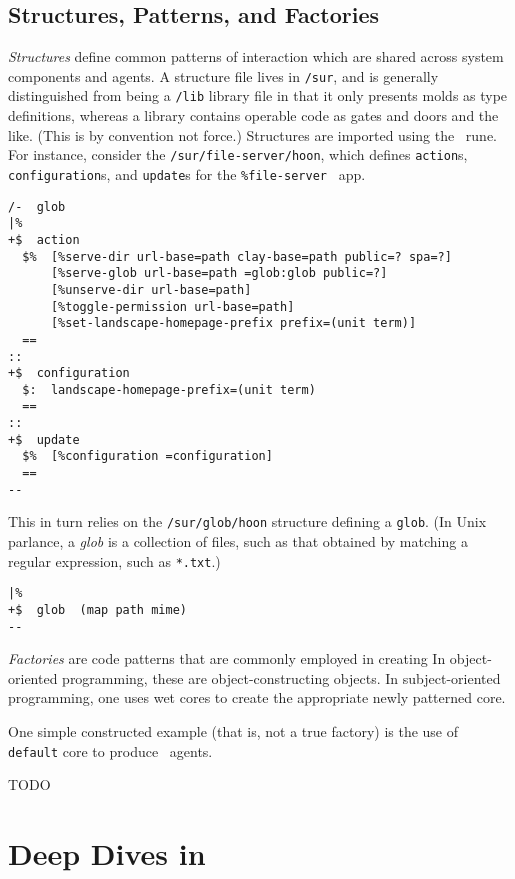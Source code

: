 \subsection{Structures, Patterns, and Factories}

\emph{Structures} define common patterns of interaction which are shared across system components and agents.  A structure file lives in \texttt{/sur}, and is generally distinguished from being a \texttt{/lib} library file in that it only presents molds as type definitions, whereas a library contains operable code as gates and doors and the like.  (This is by convention not force.)  Structures are imported using the \pfaslus~rune.  For instance, consider the \texttt{/sur/file-server/hoon}, which defines \texttt{action}s, \texttt{configuration}s, and \texttt{update}s for the \texttt{\%file-server} \gall~app.

\begin{lstlisting}[caption={\texttt{/sur/file-server/hoon}}]
/-  glob
|%
+$  action
  $%  [%serve-dir url-base=path clay-base=path public=? spa=?]
      [%serve-glob url-base=path =glob:glob public=?]
      [%unserve-dir url-base=path]
      [%toggle-permission url-base=path]
      [%set-landscape-homepage-prefix prefix=(unit term)]
  ==
::
+$  configuration
  $:  landscape-homepage-prefix=(unit term)
  ==
::
+$  update
  $%  [%configuration =configuration]
  ==
--
\end{lstlisting}

This in turn relies on the \texttt{/sur/glob/hoon} structure defining a \texttt{glob}.  (In Unix parlance, a \emph{glob} is a collection of files, such as that obtained by matching a regular expression, such as \texttt{*.txt}.)

\begin{lstlisting}[caption={\texttt{/sur/glob/hoon}}]
|%
+$  glob  (map path mime)
--
\end{lstlisting}



\emph{Factories} are code patterns that are commonly employed in creating
In object-oriented programming, these are object-constructing objects.  In subject-oriented programming, one uses wet cores to create the appropriate newly patterned core.

One simple constructed example (that is, not a true factory) is the use of \texttt{default} core to produce \gall~agents.

TODO

\section{Deep Dives in \gall}

